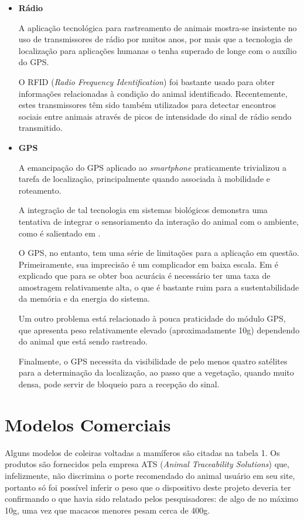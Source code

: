 \begin{itemize}
\item \textbf{Rádio}

A aplicação tecnológica para rastreamento de animais mostra-se insistente no uso de transmissores de rádio por muitos anos, por mais que a tecnologia de localização para aplicações humanas o tenha superado de longe com o auxílio do GPS.

O RFID (\emph{Radio Frequency Identification}) foi bastante usado para obter informações relacionadas à condição do animal identificado. Recentemente, estes transmissores têm sido também utilizados para detectar encontros sociais entre animais através de picos de intensidade do sinal de rádio sendo transmitido.

\item \textbf{GPS}

A emancipação do GPS aplicado ao \emph{smartphone} praticamente trivializou a tarefa de localização, principalmente quando associada à mobilidade e roteamento.

A integração de tal tecnologia em sistemas biológicos demonstra uma tentativa de integrar o sensoriamento da interação do animal com o ambiente, como é salientado em \cite{handcock}.

O GPS, no entanto, tem uma série de limitações para a aplicação em questão. Primeiramente, sua imprecisão é um complicador em baixa escala. Em \cite{handcock} é explicado que para se obter boa acurácia é necessário ter uma taxa de amostragem relativamente alta, o que é bastante ruim para a sustentabilidade da memória e da energia do sistema.

Um outro problema está relacionado à pouca praticidade do módulo GPS, que apresenta peso relativamente elevado (aproximadamente 10g) dependendo do animal que está sendo rastreado.

Finalmente, o GPS necessita da visibilidade de pelo menos quatro satélites para a determinação da localização, ao passo que a vegetação, quando muito densa, pode servir de bloqueio para a recepção do sinal.
\end{itemize}

\section{Modelos Comerciais}
Alguns modelos de coleiras voltadas a mamíferos são citadas na tabela 1. Os produtos são fornecidos pela empresa ATS (\emph{Animal Traceability Solutions}) \cite{ats} que, infelizmente, não discrimina o porte recomendado do animal usuário em seu site, portanto só foi possível inferir o peso que o dispositivo deste projeto deveria ter confirmando o que havia sido relatado pelos pesquisadores: de algo de no máximo 10g, uma vez que macacos menores pesam cerca de 400g.

